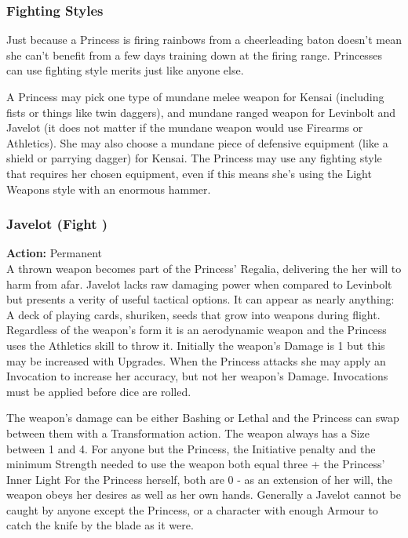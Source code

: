 \begin{mybox}
 
 \subsubsection{Fighting Styles} 
 
 Just because a Princess is firing rainbows from a cheerleading baton doesn’t mean she can't benefit from a few days training down at the firing range. Princesses can use fighting style merits just like anyone else. 
 
  
  
 A Princess may pick one type of mundane melee weapon for Kensai (including fists or things like twin daggers), and mundane ranged weapon for Levinbolt and Javelot (it does not matter if the mundane weapon would use Firearms or Athletics). She may also choose a mundane piece of defensive equipment (like a shield or parrying dagger) for Kensai. The Princess may use any fighting style that requires her chosen equipment, even if this means she's using the Light Weapons style with an enormous hammer. 
\end{mybox}

\subsubsection*{Javelot (Fight \textbullet)}

\noindent \textbf{Action:} Permanent\\

\noindent A thrown weapon becomes part of the Princess’ Regalia, delivering the her will to harm from afar. Javelot lacks raw damaging power when compared to Levinbolt but presents a verity of useful tactical options. It can appear as nearly anything: A deck of playing cards, shuriken, seeds that grow into weapons during flight. Regardless of the weapon's form it is an aerodynamic weapon and the Princess uses the Athletics skill to throw it. Initially the weapon's Damage is 1 but this may be increased with Upgrades. When the Princess attacks she may apply an Invocation to increase her accuracy, but not her weapon's Damage. Invocations must be applied before dice are rolled.

The weapon's damage can be either Bashing or Lethal and the Princess can swap between them with a Transformation action. The weapon always has a Size between 1 and 4. For anyone but the Princess, the Initiative penalty and the minimum Strength needed to use the weapon both equal three + the Princess' Inner Light For the Princess herself, both are 0 - as an extension of her will, the weapon obeys her desires as well as her own hands. Generally a Javelot cannot be caught by anyone except the Princess, or a character with enough Armour to catch the knife by the blade as it were.  


